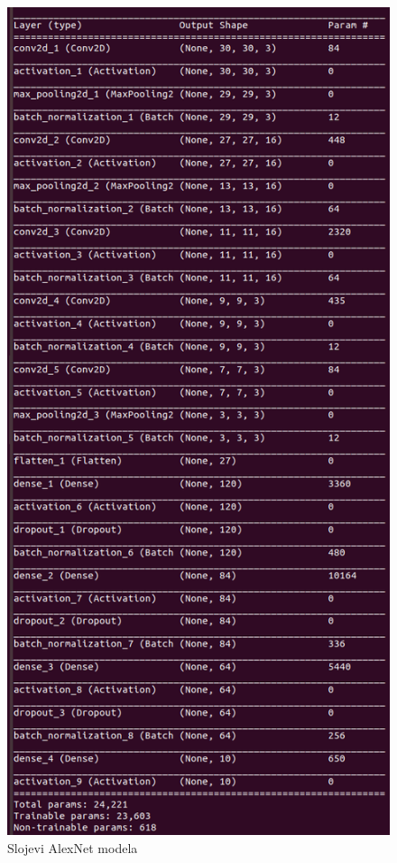 \documentclass[a4paper]{article}
\begin{document}
\begin{figure}[h!]
\begin{center}
\includegraphics[scale=0.8]{alexNet_layers.png}
\end{center}
\caption{Slojevi AlexNet modela}
\label{fig:alex_net_layers}
\end{figure}
\end{document}
